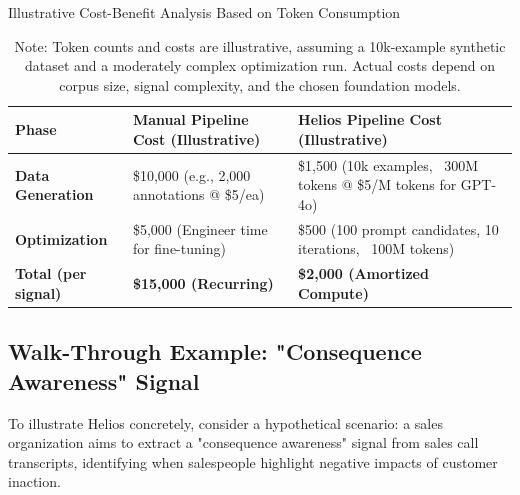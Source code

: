 \documentclass{article}
\begin{document}
\begin{table}[h]
  \centering
  \caption{Illustrative Cost-Benefit Analysis Based on Token Consumption}
  \label{tab:cost_benefit}
  \begin{tabular}{p{3.5cm} p{4.5cm} p{4.5cm}}
    \toprule
    \textbf{Phase}              & \textbf{Manual Pipeline Cost (Illustrative)} & \textbf{Helios Pipeline Cost (Illustrative)}                   \\
    \midrule
    \textbf{Data Generation}    & \$10,000 (e.g., 2,000 annotations @ \$5/ea)  & \$1,500 (10k examples, ~300M tokens @ \$5/M tokens for GPT-4o) \\
    \textbf{Optimization}       & \$5,000 (Engineer time for fine-tuning)      & \$500 (100 prompt candidates, 10 iterations, ~100M tokens)     \\
    \midrule
    \textbf{Total (per signal)} & \textbf{\$15,000 (Recurring)}                & \textbf{\$2,000 (Amortized Compute)}                           \\
    \bottomrule
  \end{tabular}
  \caption*{Note: Token counts and costs are illustrative, assuming a 10k-example synthetic dataset and a moderately complex optimization run. Actual costs depend on corpus size, signal complexity, and the chosen foundation models.}
\end{table}

\subsection{Walk-Through Example: "Consequence Awareness" Signal}
\label{subsec:walkthrough}
To illustrate Helios concretely, consider a hypothetical scenario: a sales organization aims to extract a "consequence awareness" signal from sales call transcripts, identifying when salespeople highlight negative impacts of customer inaction.
\end{document}
